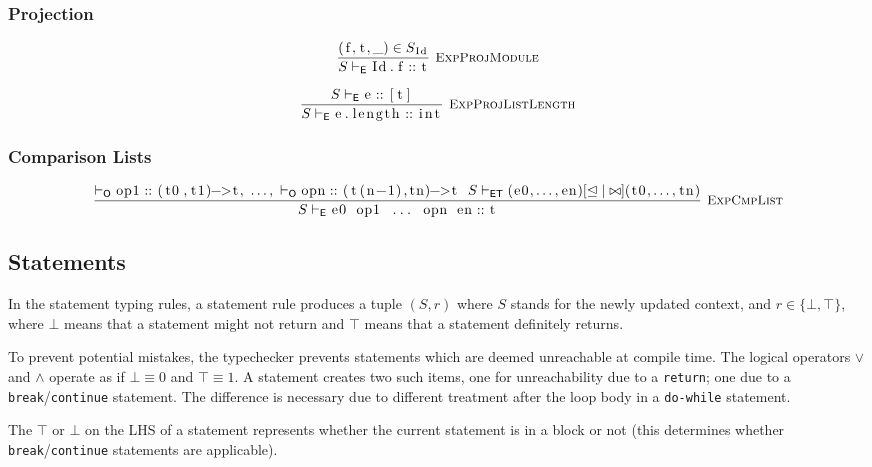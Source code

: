 \documentclass{article}
\newcommand{\code}[1]{\lstinline[columns=fixed]{#1}}
\newcommand{\drmrule}[5]{\frac{#1}{#2\vdash_{\mathsf{#3}}#4}\textsc{\ \small{#5}}}
\newcommand{\ruleapp}[1]{\vdash_{\mathsf{#1}}}
\newcommand{\mc}[1]{\textnormal{\code{#1}}}
\begin{document}
			\subsubsection{Projection}
			
				\begin{align*}
					\drmrule{(\mc{f},\mc{t},\_)\in S_{\mc{Id}}}{S}{E}{\mc{Id.f}::\mc{t}}{ExpProjModule}
				\end{align*}
			
				\begin{align*}
					\drmrule{S\ruleapp{E}\mc{e}::\mc{[t]}}{S}{E}{\mc{e.length} :: \mc{int}}{ExpProjListLength}
				\end{align*}
			
			\subsubsection{Comparison Lists}
			
				\begin{align*}
					\drmrule{\ruleapp{O}\mc{op1}::\mc{(t0,t1)->t},\ \dots,\ \ruleapp{O}\mc{opn}::\mc{(t(n-1),tn)->t}\ \ S\ruleapp{ET} (\mc{e0},\dots,\mc{en}) [\trianglelefteq|\bowtie] (\mc{t0},\dots,\mc{tn})}{S}{E}{\mc{e0 op1 ... opn en} :: \mc{t}}{ExpCmpList}
				\end{align*}
				
		\subsection{Statements}
		
			In the statement typing rules, a statement rule produces a tuple $(S,r)$ where $S$ stands for the newly updated context, and $r\in\{\bot,\top\}$, where $\bot$ means that a statement might not return and $\top$ means that a statement definitely returns.
			
			To prevent potential mistakes, the typechecker prevents statements which are deemed unreachable at compile time. The logical operators $\vee$ and $\wedge$ operate as if $\bot\equiv0$ and $\top\equiv1$. A statement creates two such items, one for unreachability due to a \code{return}; one due to a \code{break}/\code{continue} statement. The difference is necessary due to different treatment after the loop body in a \code{do-while} statement.
			
			The $\top$ or $\bot$ on the LHS of a statement represents whether the current statement is in a block or not (this determines whether \code{break}/\code{continue} statements are applicable).
		
\end{document}

